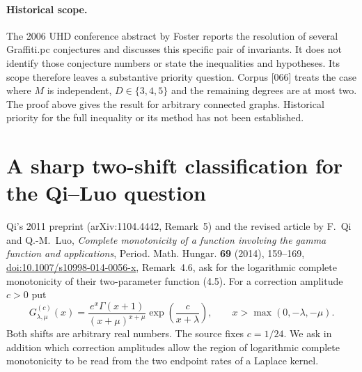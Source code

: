 \documentclass[11pt,a4paper]{article}
\numberwithin{equation}{section}
\begin{document}
\paragraph{Historical scope.}
The 2006 UHD conference abstract by Foster \cite{wow165:Foster}
reports the resolution of several Graffiti.pc conjectures and
discusses this specific pair of invariants. It does not identify those
conjecture numbers or state the inequalities and hypotheses. Its scope
therefore leaves a substantive priority question. Corpus [066] treats the case where $M$ is
independent, $D\in\{3,4,5\}$ and the remaining degrees are at most
two. The proof above gives the result for arbitrary connected graphs.
Historical priority for the full inequality or its method has not
been established.


\section{A sharp two-shift classification for the Qi--Luo question}
\label{sec:qiluo}
Qi's 2011 preprint (arXiv:1104.4442, Remark~5) and the revised article
by F.~Qi and Q.-M.~Luo, \emph{Complete monotonicity of a function
involving the gamma function and applications}, Period. Math.
Hungar. \textbf{69} (2014), 159--169,
\href{https://doi.org/10.1007/s10998-014-0056-x}{doi:10.1007/s10998-014-0056-x},
Remark~4.6, ask for the logarithmic complete monotonicity of their
two-parameter function (4.5). For a correction amplitude $c>0$ put
\[
 G^{(c)}_{\lambda,\mu}(x)=
 \frac{e^x\Gamma(x+1)}{(x+\mu)^{x+\mu}}
 \exp\!\left(\frac{c}{x+\lambda}\right),
 \qquad x>\max(0,-\lambda,-\mu).
\]
Both shifts are arbitrary real numbers. The source fixes $c=1/24$.
We ask in addition which correction amplitudes allow the region of
logarithmic complete monotonicity to be read from the two endpoint
rates of a Laplace kernel.
\end{document}
